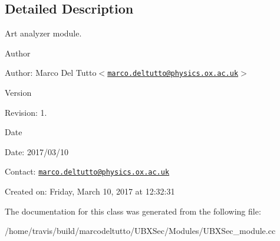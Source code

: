\subsection{\-Detailed \-Description}
\-Art analyzer module. 

\begin{DoxyAuthor}{\-Author}

\end{DoxyAuthor}
\begin{DoxyParagraph}{\-Author\-:}
\-Marco \-Del \-Tutto$<$\href{mailto:marco.deltutto@physics.ox.ac.uk}{\tt marco.\-deltutto@physics.\-ox.\-ac.\-uk}$>$ 
\end{DoxyParagraph}


\begin{DoxyVersion}{\-Version}

\end{DoxyVersion}
\begin{DoxyParagraph}{\-Revision\-:}
1. 
\end{DoxyParagraph}


\begin{DoxyDate}{\-Date}

\end{DoxyDate}
\begin{DoxyParagraph}{\-Date\-:}
2017/03/10 
\end{DoxyParagraph}


\-Contact\-: \href{mailto:marco.deltutto@physics.ox.ac.uk}{\tt marco.\-deltutto@physics.\-ox.\-ac.\-uk}

\-Created on\-: \-Friday, \-March 10, 2017 at 12\-:32\-:31 

\-The documentation for this class was generated from the following file\-:\begin{DoxyCompactItemize}
\item 
/home/travis/build/marcodeltutto/\-U\-B\-X\-Sec/\-Modules/\-U\-B\-X\-Sec\-\_\-module.\-cc\end{DoxyCompactItemize}
